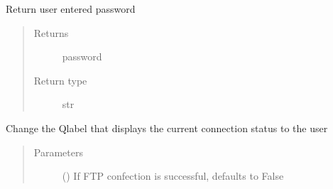\documentclass[letterpaper,10pt,english]{sphinxmanual}
\begin{document}
\begin{fulllineitems}

\begin{fulllineitems}
\label{\detokenize{polo.windows:polo.windows.ftp_dialog.FTPDialog.make_message_box}}
\end{fulllineitems}


\begin{fulllineitems}
\label{\detokenize{polo.windows:polo.windows.ftp_dialog.FTPDialog.password}}
Return user entered password
\begin{quote}\begin{description}
\item[{Returns}] \leavevmode
password

\item[{Return type}] \leavevmode
str

\end{description}\end{quote}

\end{fulllineitems}


\begin{fulllineitems}
\label{\detokenize{polo.windows:polo.windows.ftp_dialog.FTPDialog.set_connection_status}}
Change the Qlabel that displays the current connection status
to the user
\begin{quote}\begin{description}
\item[{Parameters}] \leavevmode
{} (\sphinxstyleliteralemphasis{\sphinxupquote{, }}) \textendash{} If FTP confection is successful, defaults to False


\end{description}
\end{quote}
\end{fulllineitems}
\end{fulllineitems}
\end{document}
